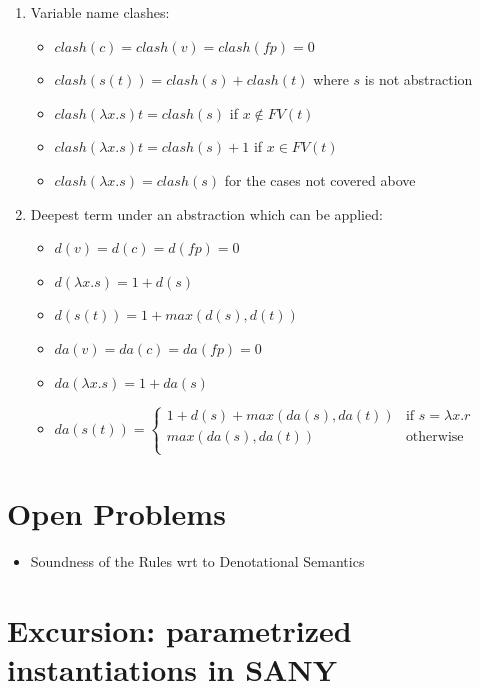 \documentclass[a4paper]{article}
\begin{document}
\begin{enumerate}
\item Variable name clashes:
  \begin{itemize}
  \item $clash(c)=clash(v)=clash(fp)=0$
  \item $clash(s(t)) = clash(s) + clash(t)$ where $s$ is not abstraction
  \item $clash(\lambda x . s) t = clash(s)$ if $x \not \in FV(t)$
  \item $clash(\lambda x . s) t = clash(s) + 1$ if $x \in FV(t)$
  \item $clash(\lambda x . s) = clash(s)$ for the cases not covered above
  \end{itemize}

\item Deepest term under an abstraction which can be applied:
  \begin{itemize}
  \item $d(v)=d(c)=d(fp)=0$
  \item $d(\lambda x . s)=1 + d(s)$
  \item $d(s(t))= 1 + max(d(s), d(t))$
  \end{itemize}

  \begin{itemize}
  \item $da(v)=da(c)=da(fp)=0$
  \item $da(\lambda x . s)=1 + da(s)$
  \item $da(s(t))= \left\{
      \begin{array}{rl}
        1 + d(s) + max(da(s),da(t))&\mbox{if }s=\lambda x.r\\
        max(da(s),da(t))&\mbox{otherwise}\\
      \end{array}\right.$
  \end{itemize}

\end{enumerate}

\section{Open Problems}
\begin{itemize}
\item Soundness of the Rules wrt to Denotational Semantics
\end{itemize}

\section{Excursion: parametrized instantiations in SANY}
\label{sec:param-inst}
\end{document}
